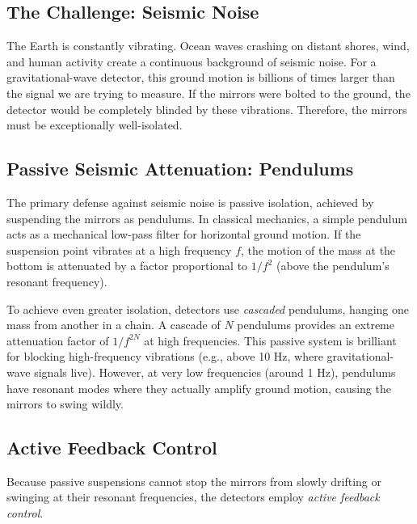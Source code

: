\documentclass{article}
\begin{document}
\subsection{The Challenge: Seismic Noise}
The Earth is constantly vibrating. Ocean waves crashing on distant shores, wind, and human activity create a continuous background of seismic noise. For a gravitational-wave detector, this ground motion is billions of times larger than the signal we are trying to measure. If the mirrors were bolted to the ground, the detector would be completely blinded by these vibrations. Therefore, the mirrors must be exceptionally well-isolated.

\subsection{Passive Seismic Attenuation: Pendulums}
The primary defense against seismic noise is passive isolation, achieved by suspending the mirrors as pendulums. 
In classical mechanics, a simple pendulum acts as a mechanical low-pass filter for horizontal ground motion. If the suspension point vibrates at a high frequency $f$, the motion of the mass at the bottom is attenuated by a factor proportional to $1/f^2$ (above the pendulum's resonant frequency). 

To achieve even greater isolation, detectors use \textit{cascaded} pendulums, hanging one mass from another in a chain. A cascade of $N$ pendulums provides an extreme attenuation factor of $1/f^{2N}$ at high frequencies. This passive system is brilliant for blocking high-frequency vibrations (e.g., above 10 Hz, where gravitational-wave signals live). However, at very low frequencies (around 1 Hz), pendulums have resonant modes where they actually amplify ground motion, causing the mirrors to swing wildly.

\subsection{Active Feedback Control}
Because passive suspensions cannot stop the mirrors from slowly drifting or swinging at their resonant frequencies, the detectors employ \textit{active feedback control}. 
\end{document}
